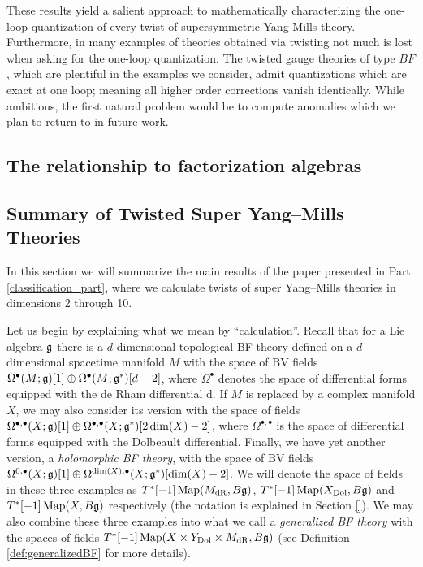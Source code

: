 \documentclass[10pt, oneside]{article}
\begin{document}
These results yield a salient approach to mathematically characterizing the one-loop quantization of every twist of supersymmetric Yang-Mills theory. 
Furthermore, in many examples of theories obtained via twisting not much is lost when asking for the one-loop quantization.
The twisted gauge theories of type $BF$, which are plentiful in the examples we consider,  admit quantizations which are exact at one loop; meaning all higher order corrections vanish identically. 
While ambitious, the first natural problem would be to compute anomalies which we plan to return to in future work.

\subsection*{The relationship to factorization algebras}

\subsection*{Summary of Twisted Super Yang--Mills Theories}

In this section we will summarize the main results of the paper presented in Part \ref{classification_part}, where we calculate twists of super Yang--Mills theories in dimensions 2 through 10.

Let us begin by explaining what we mean by ``calculation''. Recall that for a Lie algebra $\mathfrak g$ there is a $d$-dimensional topological BF theory defined on a $d$-dimensional spacetime manifold $M$ with the space of BV fields $\Omega^\bullet(M; \mathfrak g)[1]\oplus \Omega^\bullet(M; \mathfrak g^*)[d-2]$, where $\Omega^\bullet$ denotes the space of differential forms equipped with the de Rham differential $\mathrm{d}$. If $M$ is replaced by a complex manifold $X$, we may also consider its version with the space of fields $\Omega^{\bullet, \bullet}(X; \mathfrak g)[1]\oplus \Omega^{\bullet, \bullet}(X; \mathfrak g^*)[2\dim(X)-2]$, where $\Omega^{\bullet, \bullet}$ is the space of differential forms equipped with the Dolbeault differential. Finally, we have yet another version, a \emph{holomorphic BF theory}, with the space of BV fields $\Omega^{0, \bullet}(X; \mathfrak g)[1]\oplus \Omega^{\dim(X), \bullet}(X; \mathfrak g^*)[\dim(X)-2]$. We will denote the space of fields in these three examples as $T^*[-1]\operatorname{Map}(M_{\mathrm{dR}}, B\mathfrak g)$, $T^*[-1]\operatorname{Map}(X_{\mathrm{Dol}}, B\mathfrak g)$ and $T^*[-1]\operatorname{Map}(X, B\mathfrak g)$ respectively (the notation is explained in Section \ref{}). We may also combine these three examples into what we call a \emph{generalized BF theory} with the spaces of fields $T^*[-1]\operatorname{Map}(X\times Y_{\mathrm{Dol}}\times M_{\mathrm{dR}}, B\mathfrak g)$ (see Definition \ref{def:generalizedBF} for more details).
\end{document}
